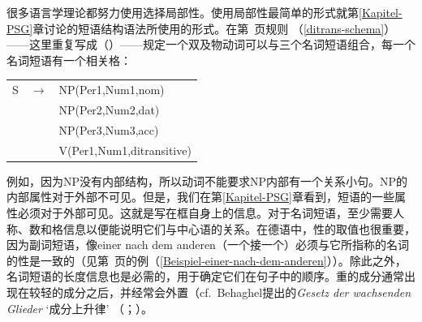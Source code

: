 很多语言学理论都努力使用选择局部性。使用局部性最简单的形式就第\ref{Kapitel-PSG}章讨论的短语结构语法所使用的形式。在第~\pageref{ditrans-schema}页规则 （\ref{ditrans-schema}）——这里重复写成（）——规定一个双及物动词可以与三个名词短语组合，每一个名词短语有一个相关格：
\ea
\begin{tabular}[t]{@{}l@{ }l@{ }l}
S  & $\to$ & NP({Per1},{Num1},{nom}) \\
   &       & NP(Per2,Num2,{dat})\\
   &       & NP(Per3,Num3,{acc})\\
   &       & V({Per1},{Num1},ditransitive)\\
\end{tabular}
\z
例如，因为NP没有内部结构，所以动词不能要求NP内部有一个关系小句。NP的内部属性对于外部不可见。但是，我们在第\ref{Kapitel-PSG}章看到，短语的一些属性必须对于外部可见。这就是写在框自身上的信息。对于名词短语，至少需要人称、数和格信息以便能说明它们与中心语的关系。在德语中，性的取值也很重要，因为副词短语，像einer nach dem anderen（一个接一个）必须与它所指称的名词的性是一致的（见第~\pageref{Beispiel-einer-nach-dem-anderen}页的例（\ref{Beispiel-einer-nach-dem-anderen}））。除此之外，名词短语的长度信息也是必需的，用于确定它们在句子中的顺序。重的成分通常出现在较轻的成分之后，并经常会外置（cf.\ Behaghel提出的\textit{Gesetz der wachsenden Glieder} `成分上升律' （\citeyear[]{Behaghel09}；\citeyear[]{Behaghel30}）。 

